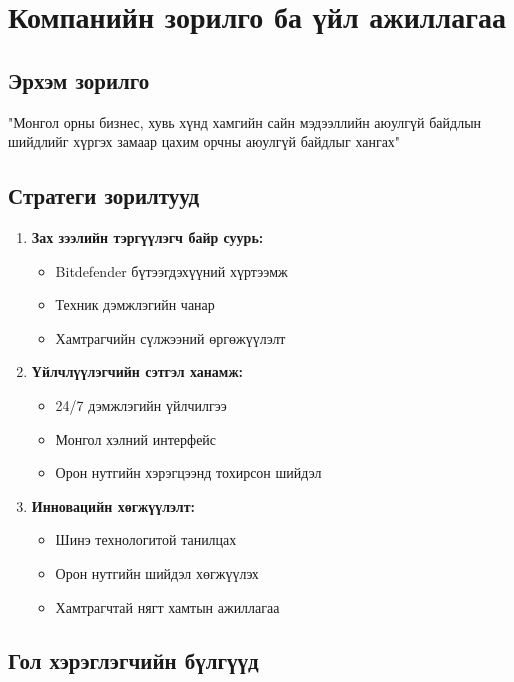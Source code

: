\documentclass[main.tex]{subfiles}
\begin{document}
\section{Компанийн зорилго ба үйл ажиллагаа}

\subsection{Эрхэм зорилго}
"Монгол орны бизнес, хувь хүнд хамгийн сайн мэдээллийн аюулгүй байдлын шийдлийг хүргэх замаар цахим орчны аюулгүй байдлыг хангах"

\subsection{Стратеги зорилтууд}

\begin{enumerate}
    \item \textbf{Зах зээлийн тэргүүлэгч байр суурь:}
    \begin{itemize}
        \item Bitdefender бүтээгдэхүүний хүртээмж
        \item Техник дэмжлэгийн чанар
        \item Хамтрагчийн сүлжээний өргөжүүлэлт
    \end{itemize}
    
    \item \textbf{Үйлчлүүлэгчийн сэтгэл ханамж:}
    \begin{itemize}
        \item 24/7 дэмжлэгийн үйлчилгээ
        \item Монгол хэлний интерфейс
        \item Орон нутгийн хэрэгцээнд тохирсон шийдэл
    \end{itemize}
    
    \item \textbf{Инновацийн хөгжүүлэлт:}
    \begin{itemize}
        \item Шинэ технологитой танилцах
        \item Орон нутгийн шийдэл хөгжүүлэх
        \item Хамтрагчтай нягт хамтын ажиллагаа
    \end{itemize}
\end{enumerate}

\subsection{Гол хэрэглэгчийн бүлгүүд}
\end{document}
